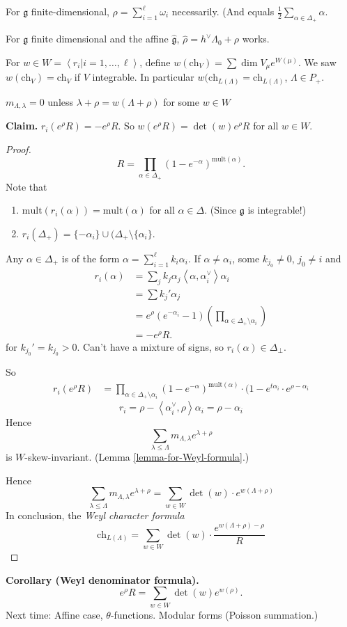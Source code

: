 \begin{remark}
\label{remark-finite-dimension}
For $\mathfrak{g}$ finite-dimensional, $\rho=\sum_{i=1}^\ell \omega_i$ 
necessarily. (And equals $\frac{1}{2}\sum_{\alpha \in \Delta_+}\alpha$.

For $\mathfrak{g}$ finite dimensional and the affine $\hat{\mathfrak{g}}$,
$\hat{\rho}=h^\vee\Lambda_0+\rho$ works.
\end{remark}

For $w \in W=\left<r_i|i=1,\ldots,\ell\right>$,
define $w(\text{ch}_V)=\sum \dim V_\mu e^{W(\mu)}$.
We saw $w(\text{ch}_V)=\text{ch}_V$ if $V$ integrable.
In particular $w(\text{ch}_{L(\Lambda)}=\text{ch}_{L(\Lambda)}$,
$\Lambda \in P_+$.

\begin{lemma}
\label{lemma-for-Weyl-formula}
$m_{\Lambda,\lambda}=0$ unless
$\lambda+\rho=w(\Lambda+\rho)$ for some $w \in W$
\end{lemma}

\medskip\noindent
{\bf Claim.} $r_i(e^{\rho} R)=-e^\rho R$. 
So $w(e^\rho R)=\det(w)e^\rho R$ for all $w \in W$.

\begin{proof}
$$
R=\prod_{\alpha \in \Delta_+}(1-e^{-\alpha})^{\text{mult}(\alpha)}.
$$
Note that
\begin{enumerate}
\item $\text{mult}(r_i(\alpha))=\text{mult}(\alpha)$ 
for all $\alpha \in \Delta$. (Since $\mathfrak{g}$ is integrable!)
\item $r_i(\Delta_+)=\{-\alpha_i\}\cup (\Delta_+\setminus\{\alpha_i\}$.
\end{enumerate}
Any $\alpha \in \Delta_+$ is of the form
$\alpha = \sum_{i=1}^\ell k_i \alpha_i$.
If $\alpha \neq \alpha_i$, some $k_{j_0}\neq 0$, $j_0 \neq  i$ and
\begin{align*}
r_i(\alpha)&=\sum_{j}k_j \alpha_j
\left<\alpha,\alpha_i^\vee\right>\alpha_i\\
&=\sum k_j' \alpha_j\\
&=e^\rho(e^{-\alpha_i}-1)
\left(\prod_{\alpha \in \Delta_+ \setminus \alpha_i}\right)\\
&=-e^\rho R.
\end{align*}
for $k_{j_0}'=k_{j_0}>0$. Can't have a mixture of signs,
so $r_i(\alpha) \in \Delta_{\perp}$.

So
\begin{align*}
r_i(e^\rho R)&=\prod_{\alpha \in \Delta_+\setminus \alpha_i}
(1-e^{-\alpha})^{\text{mult}(\alpha)}
\cdot (1-e^{t \alpha_i}\cdot e^{\rho-\alpha_i}
\end{align*}
$$
r_i=\rho-\left<\alpha_i^\vee,\rho\right>\alpha_i=\rho-\alpha_i
$$
Hence
$$
\sum_{\lambda \leq  \Lambda}m_{\Lambda,\lambda}e^{\lambda+\rho}
$$
is $W$-skew-invariant. (Lemma \ref{lemma-for-Weyl-formula}.)

Hence
$$
\sum_{\lambda \leq  \Lambda}m_{\Lambda,\lambda}e^{\lambda+\rho}
=\sum_{w \in W}\det(w)\cdot e^{w(\Lambda+\rho)}
$$
In conclusion, the {\it Weyl character formula} 
$$
\text{ch}_{L(\Lambda)}=\sum_{w \in W}\det(w)
\cdot \frac{e^{w(\Lambda+\rho)-\rho}}{R}
$$
\end{proof}

\medskip\noindent
{\bf Corollary (Weyl denominator formula).}
$$
e^{\rho}R=\sum_{w \in W}\det(w)e^{w(\rho)}.
$$
Next time: Affine case, $\theta$-functions. Modular forms (Poisson summation.)








